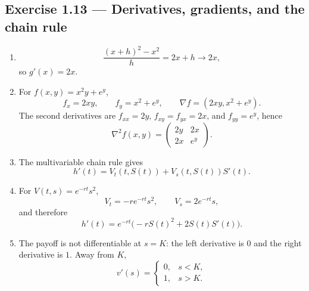 \documentclass[11pt]{article}
\newcommand{\1}{\mathbf{1}}
\begin{document}
\subsection*{Exercise 1.13 --- Derivatives, gradients, and the chain rule}
\begin{enumerate}
  \item
  \[
  \frac{(x+h)^2-x^2}{h}=2x+h\longrightarrow2x,
  \]
  so $g'(x)=2x$.
  \item For $f(x,y)=x^2y+e^y$,
  \[
  f_x=2xy,
  \qquad
  f_y=x^2+e^y,
  \qquad
  \nabla f=(2xy,x^2+e^y).
  \]
  The second derivatives are
  $f_{xx}=2y$, $f_{xy}=f_{yx}=2x$, and $f_{yy}=e^y$, hence
  \[
  \nabla^2f(x,y)=
  \begin{pmatrix}2y&2x\\2x&e^y\end{pmatrix}.
  \]
  \item The multivariable chain rule gives
  \[
  h'(t)=V_t(t,S(t))+V_s(t,S(t))S'(t).
  \]
  \item For $V(t,s)=e^{-rt}s^2$,
  \[
  V_t=-re^{-rt}s^2,
  \qquad
  V_s=2e^{-rt}s,
  \]
  and therefore
  \[
  h'(t)=e^{-rt}\bigl(-rS(t)^2+2S(t)S'(t)\bigr).
  \]
  \item The payoff is not differentiable at $s=K$: the left derivative is
  $0$ and the right derivative is $1$. Away from $K$,
  \[
  v'(s)=\begin{cases}0,&s<K,\\1,&s>K.\end{cases}
  \]
\end{enumerate}
\end{document}
